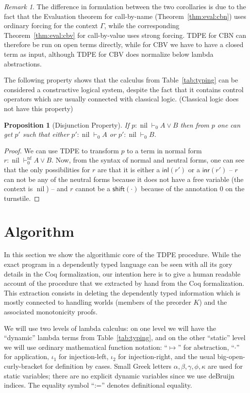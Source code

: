\documentclass{eptcs}
\newcommand{\inl}[1]{\mathsf{inl}{(#1)}}
\newcommand{\inr}[1]{\mathsf{inr}{(#1)}}
\newcommand{\shift}[1]{\mathsf{shift}{(#1)}}
\DeclareMathOperator{\Nil}{nil}
\newcommand{\normal}{{\!\!\text{nf}}}
\newcommand{\nil}{{\Nil}}
\theoremstyle{definition}
\theoremstyle{plain}
\newtheorem{proposition}[definition]{Proposition}
\theoremstyle{remark}
\newtheorem{remark}[definition]{Remark}
\begin{document}
\begin{remark}
The difference in formulation between the two corollaries is due to the fact that the Evaluation theorem for call-by-name (Theorem~\ref{thm:eval:cbn}) uses ordinary forcing for the context $\Gamma$, while the corresponding Theorem~\ref{thm:eval:cbv} for call-by-value uses strong forcing. TDPE for CBN can therefore be run on open terms directly, while for CBV we have to have a closed term as input, although TDPE for CBV does normalize below lambda abstractions.
\end{remark}

The following property shows that the calculus from Table~\ref{tab:typing} can be considered a constructive logical system, despite the fact that it contains control operators which are usually connected with classical logic. (Classical logic does not have this property)
\begin{proposition}[Disjunction Property] If $p : \nil\vdash_0 A\vee B$ then from $p$ one can get $p'$ such that either $p' : \nil\vdash_0 A$ or $p' : \nil\vdash_0 B$.
\end{proposition}
\begin{proof}
We can use TDPE to transform $p$ to a term in normal form $r : \nil\vdash^\normal_0 A\vee B$. Now, from the syntax of normal and neutral forms, one can see that the only possibilities for $r$ are that it is either a $\inl{r'}$ or a $\inr{r'}$ -- $r$ can not be any of the neutral forms because it does not have a free variable (the context is $\nil$) -- and $r$ cannot be a $\shift{\cdot}$ because of the annotation 0 on the turnstile.
\end{proof}

\section{Algorithm}\label{sec:algorithm}

In this section we show the algorithmic core of the TDPE procedure. While the exact program in a dependently typed language can be seen with all its gory details in the Coq formalization, our intention here is to give a human readable account of the procedure that we extracted by hand from the Coq formalization. This extraction consists in deleting the dependently typed information which is mostly connected to handling worlds (members of the preorder $K$) and the associated monotonicity proofs.

We will use two levels of lambda calculus: on one level we will have the ``dynamic'' lambda terms from Table~\ref{tab:typing}, and on the other ``static'' level we will use ordinary mathematical function notation: ``$\mapsto$'' for abstraction, ``$\cdot$'' for application, $\iota_1$ for injection-left, $\iota_2$ for injection-right, and the usual big-open-curly-bracket for definition by cases. Small Greek letters $\alpha,\beta,\gamma,\phi,\kappa$ are used for static variables; there are no explicit dynamic variables since we use deBruijn indices. The equality symbol ``:='' denotes definitional equality.
\end{document}
